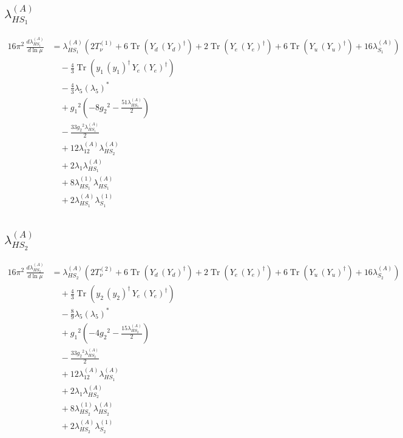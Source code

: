 \documentclass[10pt,a4paper]{article}
\begin{document}
\subsection*{$\lambda_{HS_1}^{(A)}$}
\begin{align*}
16\pi^2\,\frac{d \lambda_{HS_1}^{(A)}}{d\ln\mu} &={\lambda_{HS_1}^{(A)}} (2 T_{\nu}^{(1)}+6 \operatorname{Tr}\!\left({Y_d}\,\left({Y_d}\right)^{\dagger}\right)+2 \operatorname{Tr}\!\left({Y_e}\,\left({Y_e}\right)^{\dagger}\right)+6 \operatorname{Tr}\!\left({Y_u}\,\left({Y_u}\right)^{\dagger}\right)+16 {\lambda_{S_1}^{(A)}}) \\
&\quad -\frac{4}{3} \operatorname{Tr}\!\left({y_1}\,\left({y_1}\right)^{\dagger}\,{Y_e}\,\left({Y_e}\right)^{\dagger}\right) \\
&\quad -\frac{4}{3} {\lambda_5} \left({\lambda_5}\right)^{*} \\
&\quad +{g_1}^2 \left(-8 {g_2}^2-\frac{51 {\lambda_{HS_1}^{(A)}}}{2}\right) \\
&\quad -\frac{33 {g_2}^2 {\lambda_{HS_1}^{(A)}}}{2} \\
&\quad +12 {\lambda_{12}^{(A)}} {\lambda_{HS_2}^{(A)}} \\
&\quad +2 {\lambda_1} {\lambda_{HS_1}^{(A)}} \\
&\quad +8 {\lambda_{HS_1}^{(1)}} {\lambda_{HS_1}^{(A)}} \\
&\quad +2 {\lambda_{HS_1}^{(A)}} {\lambda_{S_1}^{(1)}} \\
\end{align*}
\subsection*{$\lambda_{HS_2}^{(A)}$}
\begin{align*}
16\pi^2\,\frac{d \lambda_{HS_2}^{(A)}}{d\ln\mu} &={\lambda_{HS_2}^{(A)}} (2 T_{\nu}^{(2)}+6 \operatorname{Tr}\!\left({Y_d}\,\left({Y_d}\right)^{\dagger}\right)+2 \operatorname{Tr}\!\left({Y_e}\,\left({Y_e}\right)^{\dagger}\right)+6 \operatorname{Tr}\!\left({Y_u}\,\left({Y_u}\right)^{\dagger}\right)+16 {\lambda_{S_2}^{(A)}}) \\
&\quad +\frac{4}{3} \operatorname{Tr}\!\left({y_2}\,\left({y_2}\right)^{\dagger}\,{Y_e}\,\left({Y_e}\right)^{\dagger}\right) \\
&\quad -\frac{8}{9} {\lambda_5} \left({\lambda_5}\right)^{*} \\
&\quad +{g_1}^2 \left(-4 {g_2}^2-\frac{15 {\lambda_{HS_2}^{(A)}}}{2}\right) \\
&\quad -\frac{33 {g_2}^2 {\lambda_{HS_2}^{(A)}}}{2} \\
&\quad +12 {\lambda_{12}^{(A)}} {\lambda_{HS_1}^{(A)}} \\
&\quad +2 {\lambda_1} {\lambda_{HS_2}^{(A)}} \\
&\quad +8 {\lambda_{HS_2}^{(1)}} {\lambda_{HS_2}^{(A)}} \\
&\quad +2 {\lambda_{HS_2}^{(A)}} {\lambda_{S_2}^{(1)}} \\
\end{align*}
\end{document}
